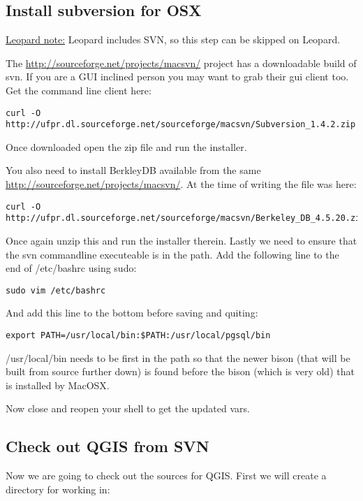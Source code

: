 \subsection{Install subversion for OSX}
\underline{Leopard note:} Leopard includes SVN, so this step can be skipped on Leopard.

The \url{http://sourceforge.net/projects/macsvn/} project has a downloadable
build of svn. If you are a GUI inclined person you may want to grab their gui
client too. Get the command line client here:

\begin{verbatim}
curl -O http://ufpr.dl.sourceforge.net/sourceforge/macsvn/Subversion_1.4.2.zip 
\end{verbatim}

Once downloaded open the zip file and run the installer.

You also need to install BerkleyDB available from the same
\url{http://sourceforge.net/projects/macsvn/}. At the time of writing the file was here:

\begin{verbatim}
curl -O http://ufpr.dl.sourceforge.net/sourceforge/macsvn/Berkeley_DB_4.5.20.zip 
\end{verbatim}

Once again unzip this and run the installer therein. Lastly we need to ensure that the svn commandline executeable is in the path. Add the following line to the end of /etc/bashrc using 
sudo:

\begin{verbatim}
sudo vim /etc/bashrc 
\end{verbatim}

And add this line to the bottom before saving and quiting:

\begin{verbatim}
export PATH=/usr/local/bin:$PATH:/usr/local/pgsql/bin 
\end{verbatim}

/usr/local/bin needs to be first in the path so that the newer bison (that will be built from source further down) is found before the bison (which is very old) that is installed by MacOSX.

Now close and reopen your shell to get the updated vars.

\subsection{Check out QGIS from SVN}
Now we are going to check out the sources for QGIS. First we will create a
directory for working in:

